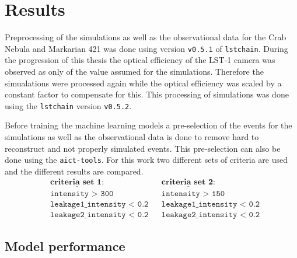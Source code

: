 \chapter{Results}
\label{ch:results}
Preprocessing of the simulations as well as the observational data for the Crab Nebula and Markarian 421 was done using version \texttt{v0.5.1} of \texttt{lstchain}.
During the progression of this thesis the optical efficiency of the LST-1 camera was observed as only  of the value assumed for the simulations.
Therefore the simualations were processed again while the optical efficiency was scaled by a constant factor to compensate for this.
This processing of simulations was done using the \texttt{lstchain} version \texttt{v0.5.2}.

Before training the machine learning models a pre-selection of the events for the simulations as well as the observational data is done to remove 
hard to reconstruct and not properly simulated events. 
This pre-selection can also be done using the \texttt{aict-tools}.
For this work two different sets of criteria are used and the different results are compared.
\begin{align*}
    &\underline{\textbf{criteria set 1:}} & &\underline{\textbf{criteria set 2:}} \\
    &\texttt{intensity > 300} & &\texttt{intensity > 150} \\
    &\texttt{leakage1\_intensity < 0.2} & &\texttt{leakage1\_intensity < 0.2} \\
    &\texttt{leakage2\_intensity < 0.2} & &\texttt{leakage2\_intensity < 0.2}
\end{align*}


\section{Model performance}
